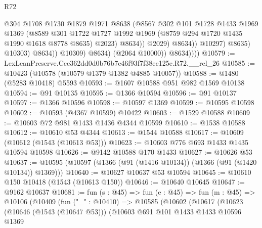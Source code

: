 \begin{lexlean}{R72}
\begin{coremodule}
                                    @304
                                    @1708
                                    @1730
                                    @1879
                                    @1971
                                    @8638
                                    (@8567
                                      @302
                                      @101
                                      @1728
                                      @1433
                                      @1969
                                      @1369
                                      (@8589
                                        @301
                                        @1722
                                        @1727
                                        @1992
                                        @1969
                                        (@8759 @294 @1720 @1435 @1990 @1618 @8778 @8635)
                                        @2023)
                                      @8634))
                                  @2029)
                                @8634))
                            @10297)
                          @8635)
                        @10303)
                      @8634))
                  @10309)
                @8634)
              (@2064 @10000))
            @8634))))
@10579 := LexLeanPreserve.Ccc362dd0d0b76b7c46f93f7f38ec125e.R72.__rel_26
@10585 := @10423 (@10578 (@10579 @1379 @1382 @4885 @10057))
@10588 := @1480 (@5283 @10418) @5593
@10593 := @1607 @10588 @951 @982 @1569 @10138
@10594 := @91 @10135
@10595 := @1366 @10594
@10596 := @91 @10137
@10597 := @1366 @10596
@10598 := @10597 @1369
@10599 := @10595 @10598
@10602 := @10593 (@4367 @10599) @10422
@10603 := @1529 @10588
@10609 := @10603 @72 @981 @1433 @1436 @4344 @10599
@10610 := @1538 @10588
@10612 := @10610 @53 @4344
@10613 := @1544 @10588
@10617 := @10609 (@10612 (@1543 (@10613 @53)))
@10623 := @10603 @776 @693 @1433 @1435 @10594 @10598
@10626 := @9142 @10588 @170 @1433
@10627 := @10626 @53
@10637 := @10595 (@10597 (@1366 (@91 (@1416 @10134)) (@1366 (@91 (@1420 @10134)) @1369)))
@10640 := @10627 @10637 @53 @10594
@10645 := @10610 @150 @10418 (@1543 (@10613 @150))
@10646 := @10640 @10645
@10647 := @9162 @10637
@10681 := fun (s : @45) =>
  fun (e : @45) =>
  fun (m : @45) =>
  @10106
    (@10409
      (fun ("_" : @10410) =>
      @10585
        (@10602
          (@10617
            (@10623
              (@10646 (@1543 (@10647 @53)))
              (@10603
                @691
                @101
                @1433
                @1433
                @10596
                @1369

\end{coremodule}
\end{lexlean}
